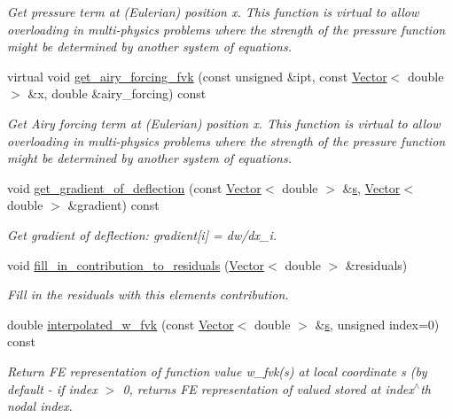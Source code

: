 \begin{DoxyCompactItemize}
\begin{DoxyCompactList}\small\item\em Get pressure term at (Eulerian) position x. This function is virtual to allow overloading in multi-\/physics problems where the strength of the pressure function might be determined by another system of equations. \end{DoxyCompactList}\item 
virtual void \hyperlink{classoomph_1_1FoepplvonKarmanEquations_a53427868998e64141f9a2c937844053a}{get\+\_\+airy\+\_\+forcing\+\_\+fvk} (const unsigned \&ipt, const \hyperlink{classoomph_1_1Vector}{Vector}$<$ double $>$ \&x, double \&airy\+\_\+forcing) const
\begin{DoxyCompactList}\small\item\em Get Airy forcing term at (Eulerian) position x. This function is virtual to allow overloading in multi-\/physics problems where the strength of the pressure function might be determined by another system of equations. \end{DoxyCompactList}\item 
void \hyperlink{classoomph_1_1FoepplvonKarmanEquations_a1fb7d4b7782b2d04f49b9ed508ec00e6}{get\+\_\+gradient\+\_\+of\+\_\+deflection} (const \hyperlink{classoomph_1_1Vector}{Vector}$<$ double $>$ \&\hyperlink{cfortran_8h_ab7123126e4885ef647dd9c6e3807a21c}{s}, \hyperlink{classoomph_1_1Vector}{Vector}$<$ double $>$ \&gradient) const
\begin{DoxyCompactList}\small\item\em Get gradient of deflection\+: gradient\mbox{[}i\mbox{]} = dw/dx\+\_\+i. \end{DoxyCompactList}\item 
void \hyperlink{classoomph_1_1FoepplvonKarmanEquations_a476cc624a69a47a4e66e1de129ad3a93}{fill\+\_\+in\+\_\+contribution\+\_\+to\+\_\+residuals} (\hyperlink{classoomph_1_1Vector}{Vector}$<$ double $>$ \&residuals)
\begin{DoxyCompactList}\small\item\em Fill in the residuals with this element\textquotesingle{}s contribution. \end{DoxyCompactList}\item 
double \hyperlink{classoomph_1_1FoepplvonKarmanEquations_a1a132ca2041cc236704ff4db2974dfc9}{interpolated\+\_\+w\+\_\+fvk} (const \hyperlink{classoomph_1_1Vector}{Vector}$<$ double $>$ \&\hyperlink{cfortran_8h_ab7123126e4885ef647dd9c6e3807a21c}{s}, unsigned index=0) const
\begin{DoxyCompactList}\small\item\em Return FE representation of function value w\+\_\+fvk(s) at local coordinate s (by default -\/ if index $>$ 0, returns FE representation of valued stored at index$^\wedge$th nodal index. \end{DoxyCompactList}\item 

\end{DoxyCompactItemize}

